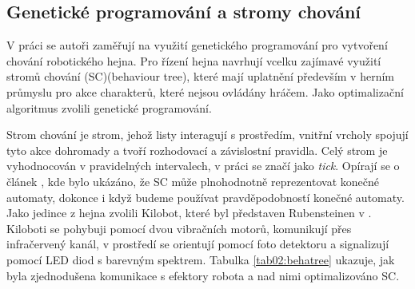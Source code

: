 \subsection*{Genetické programování a stromy chování}
V práci  \citep{Jones2018} se autoři zaměřují na využití genetického programování pro vytvoření chování robotického hejna. Pro řízení hejna navrhují vcelku zajímavé využití stromů chování (SC)(behaviour tree), které mají uplatnění především v herním průmyslu pro akce charakterů, které nejsou ovládány hráčem. Jako optimalizační algoritmus zvolili genetické programování. 
\par
Strom chování je strom, jehož listy interagují s prostředím, vnitřní vrcholy spojují tyto akce dohromady a tvoří rozhodovací a závislostní pravidla. Celý strom je vyhodnocován v pravidelných intervalech, v práci se značí jako \textit{tick}. Opírají se o článek \citep{shoulson2011parameterizing}, kde bylo ukázáno, že SC může plnohodnotně reprezentovat konečné automaty, dokonce i když budeme používat pravděpodobností konečné automaty. Jako jedince z hejna zvolili Kilobot, které byl představen Rubensteinen v \citep{Kilobots}. Kiloboti se pohybuji pomocí dvou vibračních motorů, komunikují přes infračervený kanál, v prostředí se orientují pomocí foto detektoru a signalizují pomocí LED diod s barevným spektrem. Tabulka \ref{tab02:behatree} ukazuje, jak byla zjednodušena komunikace s efektory robota a nad nimi optimalizováno SC. 
\par
\begin{table}[h]

	\caption{Parameterizing behavior trees, Motion in Games - podoba stromů}
		\label{tab02:behatree}
\end{table}
